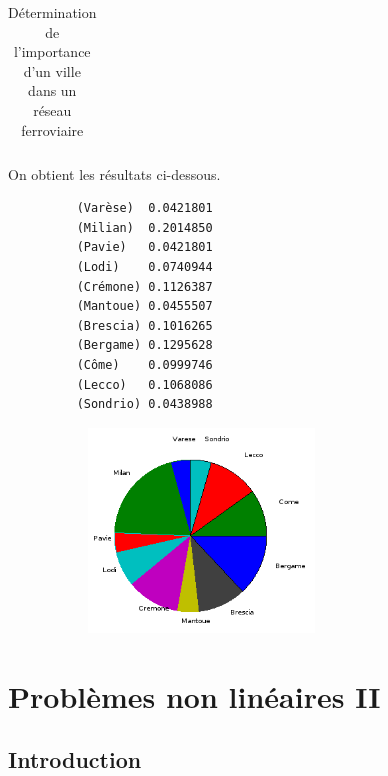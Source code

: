 \documentclass[a4paper,10pt]{report}
\begin{document}
\begin{table}[H]
\caption{Détermination de l'importance d'un ville dans un réseau ferroviaire}
\begin{tabular}{l}

\label{italie}
\end{tabular}
\end{table}

On obtient les résultats ci-dessous.
\begin{figure}[H]
\begin{minipage}[c]{.40\linewidth}
\begin{verbatim}
    (Varèse)  0.0421801  
    (Milian)  0.2014850  
    (Pavie)   0.0421801  
    (Lodi)    0.0740944  
    (Crémone) 0.1126387  
    (Mantoue) 0.0455507  
    (Brescia) 0.1016265  
    (Bergame) 0.1295628  
    (Côme)    0.0999746  
    (Lecco)   0.1068086  
    (Sondrio) 0.0438988 
\end{verbatim}
\end{minipage} \hfill
\begin{minipage}[c]{.58\linewidth}
\begin{figure}[H]
   \includegraphics[width=6cm]{diag_italiennes.png}
   \end{figure}
\end{minipage}
\end{figure}

\chapter{Problèmes non linéaires II}
\section{Introduction}

\newpage
\end{document}
